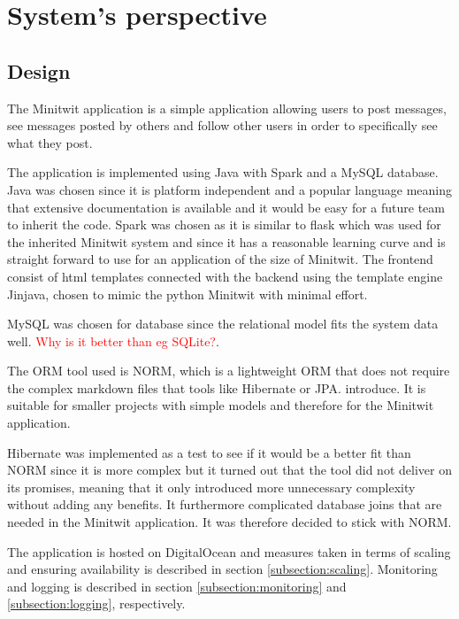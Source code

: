 \section{System's perspective} \label{section:System perspective}
\subsection{Design} %
The Minitwit application is a simple application allowing users to post messages, see messages posted by others and follow other users in order to specifically see what they post.

The application is implemented using Java with Spark and a MySQL database. Java was chosen since it is platform independent and a popular language meaning that extensive documentation is available and it would be easy for a future team to inherit the code. Spark was chosen as it is similar to flask which was used for the inherited Minitwit system and since it has a reasonable learning curve and is straight forward to use for an application of the size of Minitwit. The frontend consist of html templates connected with the backend using the template engine Jinjava, chosen to mimic the python Minitwit with minimal effort. 

MySQL was chosen for database since the relational model fits the system data well. \textcolor{red}{Why is it better than eg SQLite?}. 

The ORM tool used is NORM, which is a lightweight ORM that does not require the complex markdown files that tools like Hibernate or JPA. introduce. It is suitable for smaller projects with simple models and therefore for the Minitwit application.

Hibernate was implemented as a test to see if it would be a better fit than NORM since it is more complex but it turned out that the tool did not deliver on its promises, meaning that it only introduced more unnecessary complexity without adding any benefits. It furthermore complicated database joins that are needed in the Minitwit application. It was therefore decided to stick with NORM.

The application is hosted on DigitalOcean and measures taken in terms of scaling and ensuring availability is described in section \ref{subsection:scaling}. Monitoring and logging is described in section \ref{subsection:monitoring} and \ref{subsection:logging}, respectively. 



